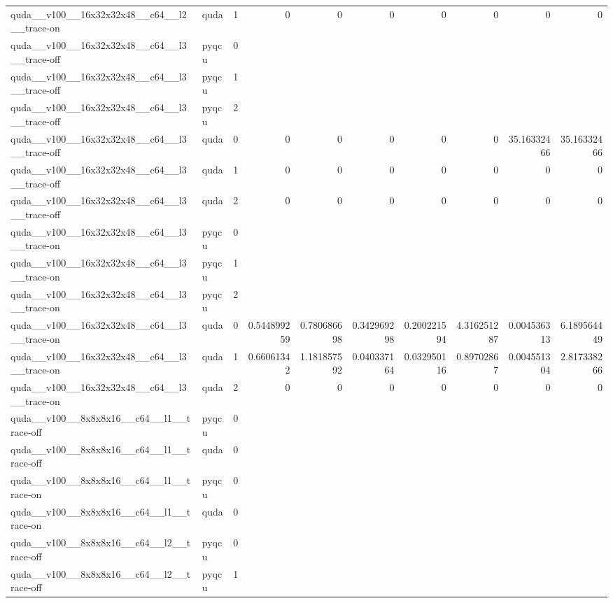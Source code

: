 \begin{table}[htbp]
\begin{tabular}{@{}llrrrrrrrr@{}}
quda\_\_v100\_\_16x32x32x48\_\_c64\_\_l2\_\_trace-on & quda & 1 & 0 & 0 & 0 & 0 & 0 & 0 & 0 \\
quda\_\_v100\_\_16x32x32x48\_\_c64\_\_l3\_\_trace-off & pyqcu & 0 &  &  &  &  &  &  &  \\
quda\_\_v100\_\_16x32x32x48\_\_c64\_\_l3\_\_trace-off & pyqcu & 1 &  &  &  &  &  &  &  \\
quda\_\_v100\_\_16x32x32x48\_\_c64\_\_l3\_\_trace-off & pyqcu & 2 &  &  &  &  &  &  &  \\
quda\_\_v100\_\_16x32x32x48\_\_c64\_\_l3\_\_trace-off & quda & 0 & 0 & 0 & 0 & 0 & 0 & 35.16332466 & 35.16332466 \\
quda\_\_v100\_\_16x32x32x48\_\_c64\_\_l3\_\_trace-off & quda & 1 & 0 & 0 & 0 & 0 & 0 & 0 & 0 \\
quda\_\_v100\_\_16x32x32x48\_\_c64\_\_l3\_\_trace-off & quda & 2 & 0 & 0 & 0 & 0 & 0 & 0 & 0 \\
quda\_\_v100\_\_16x32x32x48\_\_c64\_\_l3\_\_trace-on & pyqcu & 0 &  &  &  &  &  &  &  \\
quda\_\_v100\_\_16x32x32x48\_\_c64\_\_l3\_\_trace-on & pyqcu & 1 &  &  &  &  &  &  &  \\
quda\_\_v100\_\_16x32x32x48\_\_c64\_\_l3\_\_trace-on & pyqcu & 2 &  &  &  &  &  &  &  \\
quda\_\_v100\_\_16x32x32x48\_\_c64\_\_l3\_\_trace-on & quda & 0 & 0.544899259 & 0.780686698 & 0.342969298 & 0.200221594 & 4.316251287 & 0.004536313 & 6.189564449 \\
quda\_\_v100\_\_16x32x32x48\_\_c64\_\_l3\_\_trace-on & quda & 1 & 0.66061342 & 1.181857592 & 0.040337164 & 0.032950116 & 0.89702867 & 0.004551304 & 2.817338266 \\
quda\_\_v100\_\_16x32x32x48\_\_c64\_\_l3\_\_trace-on & quda & 2 & 0 & 0 & 0 & 0 & 0 & 0 & 0 \\
quda\_\_v100\_\_8x8x8x16\_\_c64\_\_l1\_\_trace-off & pyqcu & 0 &  &  &  &  &  &  &  \\
quda\_\_v100\_\_8x8x8x16\_\_c64\_\_l1\_\_trace-off & quda & 0 &  &  &  &  &  &  &  \\
quda\_\_v100\_\_8x8x8x16\_\_c64\_\_l1\_\_trace-on & pyqcu & 0 &  &  &  &  &  &  &  \\
quda\_\_v100\_\_8x8x8x16\_\_c64\_\_l1\_\_trace-on & quda & 0 &  &  &  &  &  &  &  \\
quda\_\_v100\_\_8x8x8x16\_\_c64\_\_l2\_\_trace-off & pyqcu & 0 &  &  &  &  &  &  &  \\
quda\_\_v100\_\_8x8x8x16\_\_c64\_\_l2\_\_trace-off & pyqcu & 1 &  &  &  &  &  &  &  \\

\end{tabular}
\end{table}
